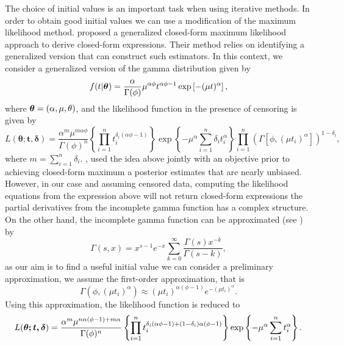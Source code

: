 The choice of initial values is an important task when using iterative methods. In order to obtain good initial values we can use a modification of the maximum likelihood method. \cite{ramos2021modified} proposed a generalized closed-form maximum likelihood approach to derive closed-form expressions. Their method relies on identifying a generalized version that can construct such estimators. In this context, we consider a generalized version of the gamma distribution given by
\begin{equation*} f(t| \boldsymbol{\theta}) = \frac{\alpha}{\Gamma(\phi)} \mu^{\alpha \phi}t^{\alpha\phi-1}\exp\left[-(\mu t)^\alpha\right],
\end{equation*}
where $\boldsymbol{\theta}=(\alpha,\mu,\theta)$, and the likelihood function in the presence of censoring is given by
\begin{equation*}L(\boldsymbol{\theta; t,\delta})
=\frac{\alpha^m\mu^{m\alpha\phi}}{\Gamma(\phi)^n}\left\{\prod_{i=1}^n{t_i^{\delta_i(\alpha\phi-1)}}\right\}\exp\left\{-\mu^{\alpha}\sum_{i=1}^n {\delta_i}t_i^{\alpha}\right\}\prod_{i=1}^n\left(\Gamma[\phi,(\mu t_i)^{\alpha}]\right)^{1-\delta_i},
\end{equation*}
where $m=\sum_{i=1}^{n}\delta_i$.  \cite{louzada2018efficient}, used the idea above jointly with an objective prior to achieving closed-form maximum a posterior estimates that are nearly unbiased. However, in our case and assuming censored data, computing the likelihood equations from the expression above will not return closed-form expressions the partial derivatives from the incomplete gamma function has a complex structure. On the other hand, the incomplete gamma function can be approximated (see  \cite{abramowitz}) by
\begin{equation*} \Gamma(s,x) = x^{s-1}e^{-x}\sum_{k=0}^{\infty} \frac{\Gamma(s)x^{-k}}{\Gamma(s-k)},
\end{equation*}
as our aim is to find a useful initial value we can consider a preliminary approximation, we assume the first-order approximation, that is
\begin{equation*}\Gamma(\phi,(\mu t_i)^\alpha) \approx (\mu t_i)^{\alpha(\phi-1)}e^{-(\mu t_i)^{\alpha}}.
\end{equation*}
Using this approximation, the likelihood function is reduced to
\begin{equation*}L(\boldsymbol{\theta;t,\delta})
=\frac{\alpha^m\mu^{n\alpha(\phi-1)+m\alpha}}{\Gamma(\phi)^n}\left\{\prod_{i=1}^n{t_i^{\delta_i(\alpha\phi-1)+(1-\delta_i)\alpha(\phi-1)}}\right\}\exp\left\{-\mu^{\alpha}\sum_{i=1}^n t_i^{\alpha}\right\}.
\end{equation*}
